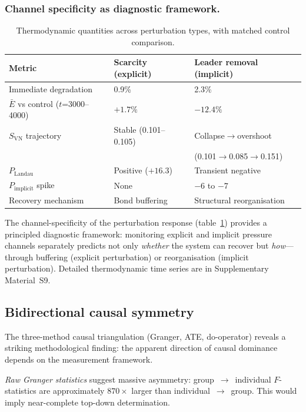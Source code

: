 \documentclass[12pt]{article}
\begin{document}
\subsubsection{Channel specificity as diagnostic framework.}

\begin{table}[htbp]
\caption{Thermodynamic quantities across perturbation types, with matched control comparison.}
\label{tab:thermo}
\centering
\begin{tabular}{@{}lll@{}}
\toprule
Metric & Scarcity (explicit) & Leader removal (implicit) \\
\midrule
Immediate degradation & 0.9\% & 2.3\% \\
$\bar{E}$ vs control ($t$=3000--4000) & $+1.7\%$ & $-12.4\%$ \\
$S_\mathrm{VN}$ trajectory & Stable (0.101--0.105) & Collapse$\to$overshoot \\
 & & (0.101$\to$0.085$\to$0.151) \\
$P_\mathrm{Landau}$ & Positive ($+16.3$) & Transient negative \\
$P_\mathrm{implicit}$ spike & None & $-6$ to $-7$ \\
Recovery mechanism & Bond buffering & Structural reorganisation \\
\bottomrule
\end{tabular}
\end{table}

The channel-specificity of the perturbation response (table~\ref{tab:thermo}) provides a principled diagnostic framework: monitoring explicit and implicit pressure channels separately predicts not only \emph{whether} the system can recover but \emph{how}---through buffering (explicit perturbation) or reorganisation (implicit perturbation). Detailed thermodynamic time series are in Supplementary Material~S9.


\subsection{Bidirectional causal symmetry}
\label{sec:causality}

The three-method causal triangulation (Granger, ATE, do-operator) reveals a striking methodological finding: the apparent direction of causal dominance depends on the measurement framework.

\emph{Raw Granger statistics} suggest massive asymmetry: group~$\to$~individual $F$-statistics are approximately $870\times$ larger than individual~$\to$~group. This would imply near-complete top-down determination.
\end{document}
